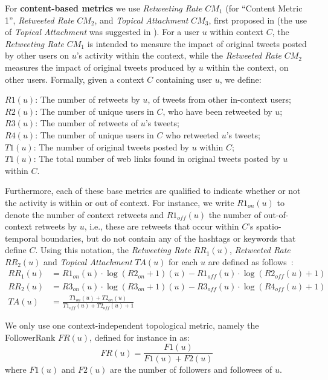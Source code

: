\documentclass[runningheads]{llncs}
\begin{document}
For \textbf{content-based metrics} we use  \textit{Retweeting Rate} $CM_1$ (for ``Content Metric 1'', \textit{Retweeted Rate} $CM_2$, and  \textit{Topical Attachment}  $CM_3$, first proposed in \cite{Bizid:2015} (the use of \textit{Topical Attachment} was suggested in \cite{Poell2014}).
%
For a user $u$ within context $C$, the \textit{Retweeting Rate}  $CM_1$ is intended to measure the impact of  original tweets posted  by other users on $u$'s activity within the context, while the \textit{Retweeted Rate} $CM_2$  measures the impact of original tweets produced by $u$ within the context, on other users.
Formally, given a context $C$ containing user $u$, we define:

\noindent 
$R1(u)$: The number of retweets by $u$, of tweets from other in-context users;\\
$R2(u)$: The number of unique users in $C$, who have been retweeted by $u$; \\
$R3(u)$: The number of retweets of $u$'s  tweets; \\
$R4(u)$: The number of unique users in $C$ who retweeted $u$'s tweets; \\
$T1(u)$: The number of original tweets posted by $u$ within $C$; \\
$T1(u)$: The total number of web links found in original tweets posted by $u$ within $C$.

Furthermore, each of these base metrics  are qualified to indicate whether or not the activity is within or out of context.
For instance, we write $R1_{on}(u)$ to denote the number of context retweets and $R1_{off}(u)$ the number of out-of-context retweets by $u$, i.e., these are retweets that occur within $C$'s spatio-temporal boundaries, but do not contain any of the hashtags or keywords that define $C$.  
Using this notation, the \textit{Retweeting Rate} $RR_1(u)$, \textit{Retweeted Rate} $RR_2(u)$ and \textit{Topical Attachment} $TA(u)$ for each $u$ are defined as follows~\cite{Bizid:2015}:
\begin{align}
RR_1(u) & =  R1_{on}(u) \cdot \log(R2_{on}+1)(u) - R1_{off}(u) \cdot \log(R2_{off}(u)+1) \\
RR_2(u) & =  R3_{on}(u) \cdot \log(R3_{on}+1)(u) - R3_{off}(u) \cdot \log(R4_{off}(u)+1) \\
TA(u) & = \frac{T1_{on}(u) + T2_{on}(u)}{T1_{off}(u) + T2_{off}(u) +1} 
\end{align}

We only use one context-independent topological metric, namely the FollowerRank $FR(u)$, defined for instance in \cite{RIQUELME2016949} as:
\begin{equation}
FR(u) = \frac{F1(u)}{F1(u)+F2(u)}
\end{equation}
where $F1(u)$ and $F2(u)$ are the number of followers and followees of $u$.
\end{document}
